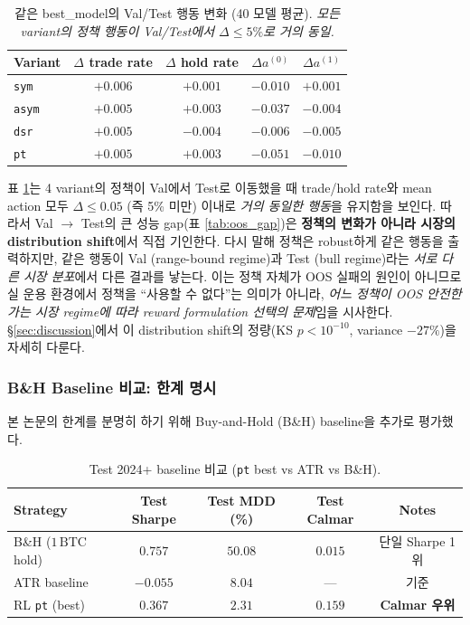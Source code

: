 \documentclass[11pt, a4paper]{article}
\begin{document}
\begin{table}[!htbp]
\centering
\caption{같은 best\_model의 Val/Test 행동 변화 (40 모델 평균).
\textit{모든 variant의 정책 행동이 Val/Test에서 $\Delta \leq 5\%$로 거의 동일.}}
\begin{tabular}{lcccc}
\toprule
Variant & $\Delta$ trade rate & $\Delta$ hold rate & $\Delta a^{(0)}$ & $\Delta a^{(1)}$ \\
\midrule
\texttt{sym}  & $+0.006$ & $+0.001$ & $-0.010$ & $+0.001$ \\
\texttt{asym} & $+0.005$ & $+0.003$ & $-0.037$ & $-0.004$ \\
\texttt{dsr}  & $+0.005$ & $-0.004$ & $-0.006$ & $-0.005$ \\
\texttt{pt}   & $+0.005$ & $+0.003$ & $-0.051$ & $-0.010$ \\
\bottomrule
\end{tabular}
\label{tab:val_test_stability}
\end{table}

표 \ref{tab:val_test_stability}는 4 variant의 정책이 Val에서 Test로 이동했을
때 trade/hold rate와 mean action 모두 $\Delta \leq 0.05$ (즉 5\% 미만) 이내로
\emph{거의 동일한 행동}을 유지함을 보인다. 따라서 Val $\to$ Test의 큰 성능
gap(표 \ref{tab:oos_gap})은 \textbf{정책의 변화가 아니라 시장의 distribution
shift}에서 직접 기인한다. 다시 말해 정책은 robust하게 같은 행동을 출력하지만,
같은 행동이 Val (range-bound regime)과 Test (bull regime)라는 \emph{서로 다른
시장 분포}에서 다른 결과를 낳는다. 이는 정책 자체가 OOS 실패의 원인이 아니므로
실 운용 환경에서 정책을 ``사용할 수 없다''는 의미가 아니라, \emph{어느 정책이
OOS 안전한가는 시장 regime에 따라 reward formulation 선택의 문제}임을 시사한다.
\S\ref{sec:discussion}에서 이 distribution shift의 정량(KS $p < 10^{-10}$,
variance $-27\%$)을 자세히 다룬다.

\subsubsection{B\&H Baseline 비교: 한계 명시}
\label{sec:oos_bh_honesty}

본 논문의 한계를 분명히 하기 위해 Buy-and-Hold (B\&H) baseline을
추가로 평가했다.

\begin{table}[!htbp]
\centering
\caption{Test 2024+ baseline 비교 (\texttt{pt} best vs ATR vs B\&H).}
\begin{tabular}{lcccc}
\toprule
Strategy & Test Sharpe & Test MDD (\%) & Test Calmar & Notes \\
\midrule
B\&H ($1\,\mathrm{BTC}$ hold) & $\mathbf{0.757}$ & $50.08$ & $0.015$ & 단일 Sharpe 1위 \\
ATR baseline & $-0.055$ & $8.04$ & --- & 기준 \\
RL \texttt{pt} (best) & $0.367$ & $2.31$ & $\mathbf{0.159}$ & \textbf{Calmar 우위} \\
\bottomrule
\end{tabular}
\label{tab:bh_comparison}
\end{table}
\end{document}
